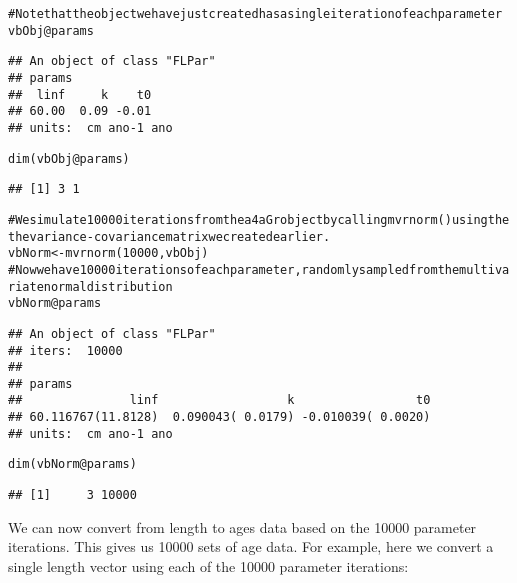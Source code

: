 \documentclass[a4paper,english,10pt]{article}\usepackage[]{graphicx}\usepackage[]{color}
\makeatletter
\newcommand{\hlnum}[1]{\textcolor[rgb]{0.2,0.2,0.2}{#1}}%
\newcommand{\hlcom}[1]{\textcolor[rgb]{0.2,0.267,0.4}{#1}}%
\newcommand{\hlopt}[1]{\textcolor[rgb]{0.2,0.2,0.2}{#1}}%
\newcommand{\hlstd}[1]{\textcolor[rgb]{0,0,0}{#1}}%
\newcommand{\hlkwb}[1]{\textcolor[rgb]{0.361,0.506,0.596}{#1}}%
\newcommand{\hlkwc}[1]{\textcolor[rgb]{0.361,0.506,0.596}{#1}}%
\newcommand{\hlkwd}[1]{\textcolor[rgb]{0.361,0.506,0.596}{#1}}%
\newenvironment{kframe}{%
 \def\at@end@of@kframe{}%
 \ifinner\ifhmode%
  \def\at@end@of@kframe{\end{minipage}}%
  \begin{minipage}{\columnwidth}%
 \fi\fi%
 \def\FrameCommand##1{\hskip\@totalleftmargin \hskip-\fboxsep
 \colorbox{shadecolor}{##1}\hskip-\fboxsep
     \hskip-\linewidth \hskip-\@totalleftmargin \hskip\columnwidth}%
 \MakeFramed {\advance\hsize-\width
   \@totalleftmargin\z@ \linewidth\hsize
   \@setminipage}}%
 {\par\unskip\endMakeFramed%
 \at@end@of@kframe}
\newenvironment{knitrout}{}{} %
\makeatother
\begin{document}
\begin{knitrout}
\color{fgcolor}\begin{kframe}
\begin{alltt}
\hlcom{# Note that the object we have just created has a single iteration of each parameter}
\hlstd{vbObj}\hlopt{@}\hlkwc{params}
\end{alltt}
\begin{verbatim}
## An object of class "FLPar"
## params
##  linf     k    t0 
## 60.00  0.09 -0.01 
## units:  cm ano-1 ano
\end{verbatim}
\begin{alltt}
\hlkwd{dim}\hlstd{(vbObj}\hlopt{@}\hlkwc{params}\hlstd{)}
\end{alltt}
\begin{verbatim}
## [1] 3 1
\end{verbatim}
\begin{alltt}
\hlcom{# We simulate 10000 iterations from the a4aGr object by calling mvrnorm() using the the variance-covariance matrix we created earlier.}
\hlstd{vbNorm} \hlkwb{<-} \hlkwd{mvrnorm}\hlstd{(}\hlnum{10000}\hlstd{,vbObj)}
\hlcom{# Now we have 10000 iterations of each parameter, randomly sampled from the multivariate normal distribution}
\hlstd{vbNorm}\hlopt{@}\hlkwc{params}
\end{alltt}
\begin{verbatim}
## An object of class "FLPar"
## iters:  10000 
## 
## params
##               linf                  k                 t0 
## 60.116767(11.8128)  0.090043( 0.0179) -0.010039( 0.0020) 
## units:  cm ano-1 ano
\end{verbatim}
\begin{alltt}
\hlkwd{dim}\hlstd{(vbNorm}\hlopt{@}\hlkwc{params}\hlstd{)}
\end{alltt}
\begin{verbatim}
## [1]     3 10000
\end{verbatim}
\end{kframe}
\end{knitrout}

We can now convert from length to ages data based on the 10000 parameter iterations. This gives us 10000 sets of age data. For example, here we convert a single length vector using each of the 10000 parameter iterations: 
\end{document}
